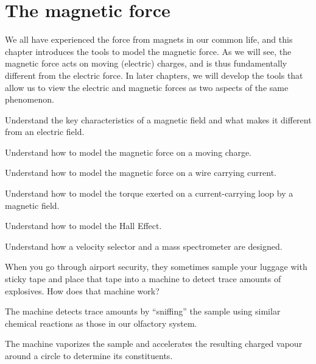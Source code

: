 
\chapter{The magnetic force}
\label{chapter:magneticforce}
We all have experienced the force from magnets in our common life, and this chapter introduces the tools to model the magnetic force. As we will see, the magnetic force acts on moving (electric) charges, and is thus fundamentally different from the electric force. In later chapters, we will develop the tools that allow us to view the electric and magnetic forces as two aspects of the same phenomenon.

\begin{learningObjectives}{
 \item Understand the key characteristics of a magnetic field and what makes it different from an electric field.
 \item Understand how to model the magnetic force on a moving charge.
 \item Understand how to model the magnetic force on a wire carrying current.
 \item Understand how to model the torque exerted on a current-carrying loop by a magnetic field.
 \item Understand how to model the Hall Effect.
 \item Understand how a velocity selector and a mass spectrometer are designed.
 }
\end{learningObjectives}

\begin{opening}
\begin{MCquestion}{When you go through airport security, they sometimes sample your luggage with sticky tape and place that tape into a machine to detect trace amounts of explosives. How does that machine work?}
\item The machine detects trace amounts by ``sniffing'' the sample using similar chemical reactions as those in our olfactory system.
\item The machine vaporizes the sample and accelerates the resulting charged vapour around a circle to determine its constituents. \correct
\end{MCquestion}
\end{opening}

